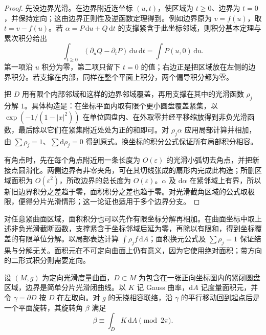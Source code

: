 \begin{proof}
	先设边界光滑。在边界附近选坐标 \((u,t)\)，使区域为 \(t\ge0\)、边界为 \(t=0\)，并保持定向；这由边界正则性及逆函数定理得到。例如边界原为 \(v=f(u)\)，取 \(t=v-f(u)\)。若 \(\alpha=P\,\mathrm{d}u+Q\,\mathrm{d}t\) 的支撑紧含于此坐标邻域，则积分基本定理与累次积分给出
	\[
		\int_{t\ge0}(\partial_uQ-\partial_tP)\,\mathrm{d}u\,\mathrm{d}t
		=\int P(u,0)\,\mathrm{d}u.
	\]
	第一项沿 \(u\) 积分为零，第二项只留下 \(t=0\) 的值；右边正是把区域放在左侧的边界积分。若支撑在内部，同样在整个平面上积分，两个偏导积分都为零。

	把 \(D\) 用有限个内部邻域和这样的边界邻域覆盖，再用支撑在其中的光滑函数 \(\rho_j\) 分解 \(1\)。具体构造是：在坐标平面内取有限个更小圆盘覆盖紧集，以 \(\exp(-1/(1-|x|^2))\) 在单位圆盘内、在外取零并经平移缩放得到非负光滑函数，最后除以它们在紧集附近处处为正的和即可。对 \(\rho_j\alpha\) 应用局部计算并相加，由 \(\sum\rho_j=1\)、\(\sum\mathrm{d}\rho_j=0\) 得到原式。换坐标的积分公式保证所有局部积分相容。

	有角点时，先在每个角点附近用一条长度为 \(O(\varepsilon)\) 的光滑小弧切去角点，并把新接点圆滑化。两侧边界有非零夹角，可在其切线张成的扇形内完成此构造；所删区域面积为 \(O(\varepsilon^2)\)，所改边界的总长度为 \(O(\varepsilon)\)。\(\alpha\) 及 \(\mathrm{d}\alpha\) 在紧邻域上有界，所以新旧边界积分之差趋于零，面积积分之差也趋于零。对光滑截角区域的公式取极限，便得分片光滑情形；这一论证也适用于多个边界分支。
\end{proof}

对任意紧曲面区域，面积积分也可以先作有限坐标分解再相加。在曲面坐标中取上述非负光滑截断函数，支撑紧含于坐标邻域后延为零，再除以有限和，得到坐标覆盖的有限单位分解。以局部表达计算 \(\int\rho_j f\,\mathrm{d}A\)；面积换元公式及 \(\sum\rho_j=1\) 保证结果与分解无关。面积元在不可定向曲面上仍有意义，因为它使用绝对面积；带方向的二形式积分则需要定向。

\begin{proposition}
	\label{g1:prop:surface-local-holonomy}
	设 \((M,g)\) 为定向光滑度量曲面，\(D\subset M\) 为包含在一张正向坐标图内的紧闭圆盘区域，边界是简单分片光滑闭曲线。以 \(K\) 记 Gauss 曲率，\(\mathrm dA\) 记度量面积元，并令 \(\gamma=\partial D\) 按 \(D\) 在左取向。对 \(g\) 的无挠相容联络，沿 \(\gamma\) 的平行移动回到起点后是一个平面旋转，其旋转角 \(\beta\) 满足
	\begin{equation}
		\label{g1:eq:surface-holonomy-integral}
		\beta\equiv\int_D K\,\mathrm{d}A\pmod{2\pi}.
	\end{equation}
\end{proposition}

